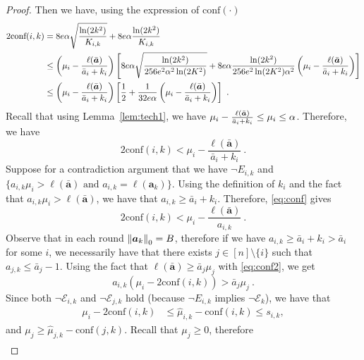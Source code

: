 \begin{proof}
	
	\noindent Then we have, using the expression of $\text{conf}(\cdot)$
	\begin{align*}
		2\text{conf}(i,k) &=  8e\alpha\sqrt{\frac{ \ln(2k^2)}{K_{i,k}}}+8e\alpha\frac{ \ln(2k^2)}{K_{i,k}}\\
		&\le \left(\mu_i - \frac{\ell(\bar{\bm{a}})}{\bar{a}_i+k_i}\right) \left[ 8e\alpha \sqrt{\frac{\ln(2k^2)}{256e^2\alpha^2 \ln(2K^2)}}+ 8e\alpha \frac{\ln(2k^2)}{256e^2\ln(2K^2)\alpha^2}\left(\mu_i-\frac{\ell(\bar{\bm{a}})}{\bar{a}_i+k_i}\right)\right]\\
		&\le \left(\mu_i - \frac{\ell(\bar{\bm{a}})}{\bar{a}_i+k_i}\right) \left[\frac{1}{2} + \frac{1}{32e\alpha} \left(\mu_i-\frac{\ell(\bar{\bm{a}})}{\bar{a}_i+k_i}\right) \right]~.
	\end{align*}
	Recall that using Lemma~\ref{lem:tech1}, we have $\mu_i-\frac{\ell(\bar{\bm{a}})}{\bar{a}_i+k_i} \le \mu_i \le \alpha$. Therefore, we have
	\begin{equation}\label{eq:conf}
		2\text{conf}(i,k) < \mu_i - \frac{\ell(\bar{\bm{a}})}{\bar{a}_i+k_i}~.
	\end{equation}
	Suppose for a contradiction argument that we have $\neg E_{i,k}$ and $\{ a_{i,k}\mu_i > \ell(\bar{\bm{a}}) \text{ and } a_{i,k} = \ell(\bm{a}_k)\}$.
	Using the definition of $k_i$ and the fact that $a_{i,k} \mu_i > \ell(\bar{\bm{a}})$, we have that $a_{i,k} \ge \bar{a}_i + k_i$. Therefore, \eqref{eq:conf} gives
	\begin{equation}\label{eq:conf2}
		2\text{conf}(i,k) < \mu_i - \frac{\ell(\bar{\bm{a}})}{a_{i,k}}~.
	\end{equation}
	Observe that in each round $\left\| \bm{a}_k \right\|_0 = B$, therefore if we have $a_{i,k} \ge \bar{a}_i+k_i > \bar{a}_i$ for some $i$, we necessarily have that there exists $j \in [n]\setminus \{i\}$ such that $a_{j,k} \le \bar{a}_j-1$. Using the fact that $\ell(\bar{\bm{a}}) \ge \bar{a}_j \mu_j$ with \eqref{eq:conf2}, we get
	\begin{equation}\label{eq:e1}
		a_{i,k}(\mu_i-2\text{conf}(i,k)) > \bar{a}_j \mu_j~.
	\end{equation}
	Since both $\neg \mathcal{E}_{i,k}$ and $\neg \mathcal{E}_{j,k}$ hold (because $\neg E_{i,k}$ implies $\neg \mathcal{E}_k$), we have that
	\begin{align}
		\mu_i - 2\text{conf}(i,k) &\le \hat{\mu}_{i, k} - \text{conf}(i,k)
		\le s_{i,k},\label{eq:mu2}
	\end{align} 
	and $\mu_j \ge \hat{\mu}_{j,k} - \text{conf}(j,k)$.
	Recall that $\mu_j \ge 0$, therefore
	\begin{align}

\end{align}
\end{proof}
